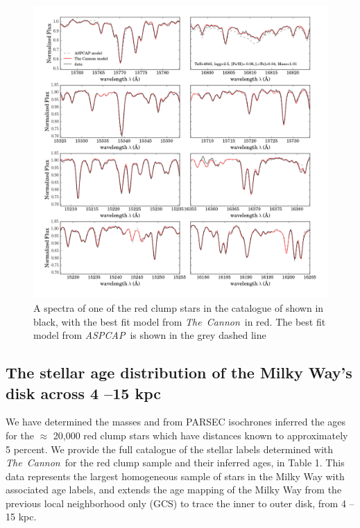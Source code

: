 \documentclass[12pt, preprint]{aastex}
\newcommand{\project}[1]{\textsl{#1}}
\newcommand{\tc}{\project{The~Cannon}}
\newcommand{\aspcap}{\project{ASPCAP}}
\begin{document}
\begin{figure}[h!]
\centering
      \includegraphics[scale=0.5]{./plots/spectra_fits_7.png}
  \caption{A spectra of one of the red clump stars in the catalogue of \citet{Bovy2014} shown in black, with the best fit model from \tc\ in red. The best fit model from \aspcap\ is shown in the grey dashed line}
\label{fig:spectra}
\end{figure}



\subsection{The stellar age distribution of the Milky Way's disk across 4 --15 kpc}

We have determined the masses and from PARSEC isochrones inferred the ages for the $\approx$ 20,000 red clump stars which have distances known to approximately 5 percent. We provide the full catalogue of the stellar labels determined with \tc\ for the red clump sample and their inferred ages, in Table 1. This data represents the largest homogeneous sample of stars in the Milky Way with associated age labels, and extends the age mapping of the Milky Way from the previous local neighborhood only (GCS) to trace the inner to outer disk, from 4 -- 15 kpc.  
\end{document}

